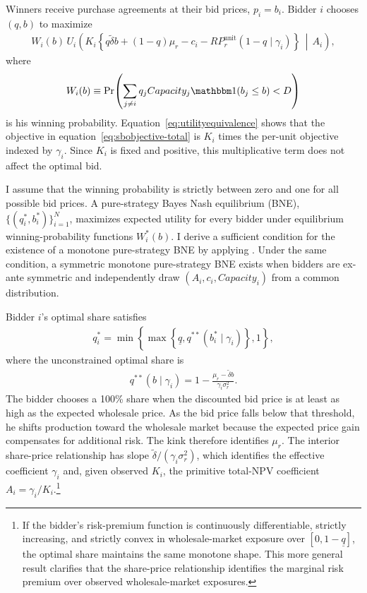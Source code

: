 \documentclass[10pt]{article}
\newcommand{\I}{\mathbbm1}
\theoremstyle{plain}
\theoremstyle{definition}
\begin{document}
Winners receive purchase agreements at their bid prices, $p_i=b_i$. Bidder
$i$ chooses $(q,b)$ to maximize
\begin{align}
\label{eq:sbobjective-total}
W_i(b)\,
U_i\!\left(
K_i\left\{q\widetilde{\delta}b+(1-q)\mu_r-c_i
-RP_r^{\mathrm{unit}}(1-q\mid\gamma_i)\right\}
\,\middle|\,A_i
\right),
\end{align}
where
\begin{align}
\label{eq:winprob}
W_i(b)
\equiv
\Pr\!\left(
\sum_{j\neq i}q_jCapacity_j\I(b_j\leq b)<D
\right)
\end{align}
is his winning probability. Equation~\eqref{eq:utilityequivalence} shows that
the objective in equation~\eqref{eq:sbobjective-total} is $K_i$ times the
per-unit objective indexed by $\gamma_i$. Since $K_i$ is fixed and positive,
this multiplicative term does not affect the optimal bid.

I assume that the winning probability is strictly between zero and one for
all possible bid prices. A pure-strategy Bayes Nash equilibrium (BNE),
$\{(q_i^\ast,b_i^\ast)\}_{i=1}^N$, maximizes expected utility for every bidder
under equilibrium winning-probability functions $W_i^\ast(b)$. I derive a
sufficient condition for the existence of a monotone pure-strategy BNE by
applying \citet{Reny2011}. Under the same condition, a symmetric monotone
pure-strategy BNE exists when bidders are ex-ante symmetric and independently
draw $(A_i,c_i,Capacity_i)$ from a common distribution.

Bidder $i$'s optimal share satisfies
\begin{align*}
q_i^\ast
=\min\!\left\{
\max\!\left\{\underline{q},q^{\ast\ast}(b_i^\ast\mid\gamma_i)\right\},1
\right\},
\end{align*}
where the unconstrained optimal share is
\begin{align}
\label{eq:optqsb}
q^{\ast\ast}(b\mid\gamma_i)
=1-\frac{\mu_r-\widetilde{\delta}b}{\gamma_i\sigma_r^2}.
\end{align}
The bidder chooses a 100\% share when the discounted bid price is at least as
high as the expected wholesale price. As the bid price falls below that
threshold, he shifts production toward the wholesale market because the
expected price gain compensates for additional risk. The kink therefore
identifies $\mu_r$. The interior share-price relationship has slope
$\widetilde{\delta}/(\gamma_i\sigma_r^2)$, which identifies the effective
coefficient $\gamma_i$ and, given observed $K_i$, the primitive total-NPV
coefficient $A_i=\gamma_i/K_i$.\footnote{
If the bidder's risk-premium function is continuously differentiable,
strictly increasing, and strictly convex in wholesale-market exposure over
$[0,1-\underline{q}]$, the optimal share maintains the same monotone shape.
This more general result clarifies that the share-price relationship identifies
the marginal risk premium over observed wholesale-market exposures.
}
\end{document}
